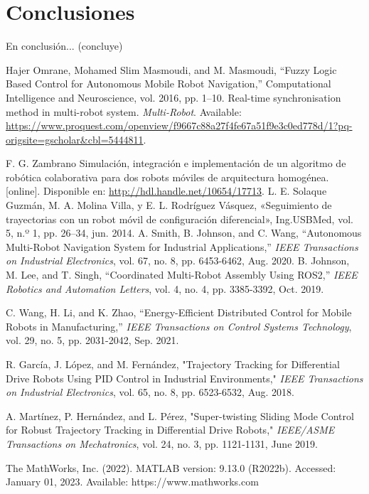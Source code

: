 \documentclass[conference]{IEEEtran}
\begin{document}
\section{Conclusiones}

    En conclusión... (concluye)

\begin{thebibliography}{00}
     Hajer Omrane, Mohamed Slim Masmoudi, and M. Masmoudi, “Fuzzy Logic Based Control for Autonomous Mobile Robot Navigation,” Computational Intelligence and Neuroscience, vol. 2016, pp. 1–10.
     Real-time synchronisation method in multi-robot system. \textit{Multi-Robot}. Available: \url{https://www.proquest.com/openview/f9667c88a27f4fe67a51f9e3c0ed778d/1?pq-origsite=gscholar&cbl=5444811}.
    
     F. G. Zambrano Simulación, integración e implementación de un algoritmo de robótica colaborativa para dos robots móviles de arquitectura homogénea. [online]. Disponible en: \url{ http://hdl.handle.net/10654/17713}.
     L. E. Solaque Guzmán, M. A. Molina Villa, y E. L. Rodríguez Vásquez, «Seguimiento de trayectorias con un robot móvil de configuración diferencial», Ing.USBMed, vol. 5, n.º 1, pp. 26–34, jun. 2014.
     A. Smith, B. Johnson, and C. Wang, ``Autonomous Multi-Robot Navigation System for Industrial Applications,'' \textit{IEEE Transactions on Industrial Electronics}, vol. 67, no. 8, pp. 6453-6462, Aug. 2020.
     B. Johnson, M. Lee, and T. Singh, ``Coordinated Multi-Robot Assembly Using ROS2,'' \textit{IEEE Robotics and Automation Letters}, vol. 4, no. 4, pp. 3385-3392, Oct. 2019.

     C. Wang, H. Li, and K. Zhao, ``Energy-Efficient Distributed Control for Mobile Robots in Manufacturing,'' \textit{IEEE Transactions on Control Systems Technology}, vol. 29, no. 5, pp. 2031-2042, Sep. 2021.

     R. García, J. López, and M. Fernández, "Trajectory Tracking for Differential Drive Robots Using PID Control in Industrial Environments," \textit{IEEE Transactions on Industrial Electronics}, vol. 65, no. 8, pp. 6523-6532, Aug. 2018.

     A. Martínez, P. Hernández, and L. Pérez, "Super-twisting Sliding Mode Control for Robust Trajectory Tracking in Differential Drive Robots," \textit{IEEE/ASME Transactions on Mechatronics}, vol. 24, no. 3, pp. 1121-1131, June 2019.
    
     The MathWorks, Inc. (2022). MATLAB version: 9.13.0 (R2022b). Accessed: January 01, 2023. Available: https://www.mathworks.com


\end{thebibliography}
\end{document}

